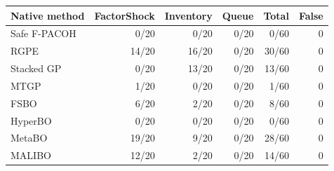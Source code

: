 \begin{tabular}{lrrrrr}
\toprule
Native method & FactorShock & Inventory & Queue & Total & False \\
\midrule
Safe F-PACOH & 0/20 & 0/20 & 0/20 & 0/60 & 0 \\
RGPE & 14/20 & 16/20 & 0/20 & 30/60 & 0 \\
Stacked GP & 0/20 & 13/20 & 0/20 & 13/60 & 0 \\
MTGP & 1/20 & 0/20 & 0/20 & 1/60 & 0 \\
FSBO & 6/20 & 2/20 & 0/20 & 8/60 & 0 \\
HyperBO & 0/20 & 0/20 & 0/20 & 0/60 & 0 \\
MetaBO & 19/20 & 9/20 & 0/20 & 28/60 & 0 \\
MALIBO & 12/20 & 2/20 & 0/20 & 14/60 & 0 \\
\bottomrule
\end{tabular}
